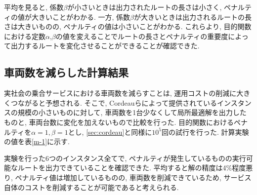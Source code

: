 平均を見ると, 係数$\beta$が小さいときは出力されたルートの長さは小さく, ペナルティの値が大きいことがわかる. 一方, 係数$\beta$が大きいときは出力されるルートの長さは大きいものの, ペナルティの値は小さいことがわかる. これらより, 目的関数における定数$\alpha$,$\beta$の値を変えることでルートの長さとペナルティの重要度によって出力するルートを変化させることができることが確認できた.

\subsection{車両数を減らした計算結果}
実社会の乗合サービスにおける車両数を減らすことは, 運用コストの削減に大きくつながると予想される. そこで, Cordeauらによって提供されているインスタンスの規模の小さいものに対して, 車両数を1台少なくして局所最適解を出力したものと, 車両台数に変化を加えないもので比較を行った. 目的関数におけるペナルティを$\alpha=1,\beta=1$とし, \ref{sec:cordeau}と同様に$10^5$回の試行を行った. 計算実験の値を表\ref{m-1}に示す.

実験を行った6つのインスタンス全てで, ペナルティが発生しているものの実行可能なルートを出力できていることを確認できた. 平均すると解の精度は4\%程度悪り, ペナルティ値は増加しているものの, 車両数を削減できているため, サービス自体のコストを削減することが可能であると考えられる.




